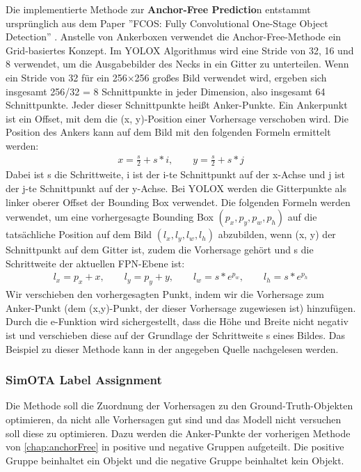 Die implementierte Methode zur \textbf{Anchor-Free Predictio}n entstammt ursprünglich aus dem Paper ''FCOS: Fully Convolutional One-Stage Object Detection'' \cite{yoloxAnchorFree}. Anstelle von Ankerboxen verwendet die Anchor-Free-Methode ein Grid-basiertes Konzept. Im YOLOX Algorithmus wird eine Stride von 32, 16 und 8 verwendet, um die Ausgabebilder des Necks in ein Gitter zu unterteilen. Wenn ein Stride von 32 für ein 256×256 großes Bild verwendet wird, ergeben sich insgesamt 256/32 = 8 Schnittpunkte in jeder Dimension, also insgesamt 64 Schnittpunkte. Jeder dieser Schnittpunkte heißt Anker-Punkte. Ein Ankerpunkt ist ein Offset, mit dem die (x, y)-Position einer Vorhersage verschoben wird. Die Position des Ankers kann auf dem Bild mit den folgenden Formeln ermittelt werden:
\begin{align}
	x = \frac{s}{2} + s*i, \qquad y = \frac{s}{2} + s*j
\end{align}
Dabei ist s die Schrittweite, i ist der i-te Schnittpunkt auf der x-Achse und j ist der j-te Schnittpunkt auf der y-Achse. Bei YOLOX werden die Gitterpunkte als linker oberer Offset der Bounding Box verwendet. Die folgenden Formeln werden verwendet, um eine vorhergesagte Bounding Box $(p_x, p_y, p_w, p_h)$ auf die tatsächliche Position auf dem Bild $(l_x, l_y, l_w, l_h)$ abzubilden, wenn (x, y) der Schnittpunkt auf dem Gitter ist, zudem die Vorhersage gehört und s die Schrittweite der aktuellen FPN-Ebene ist:
\begin{align}
	l_x=p_x+x, \qquad l_y=p_y+y, \qquad l_w=s*e^{p_w}, \qquad l_h=s*e^{p_h}
\end{align}
Wir verschieben den vorhergesagten Punkt, indem wir die Vorhersage zum Anker-Punkt (dem (x,y)-Punkt, der dieser Vorhersage zugewiesen ist) hinzufügen. Durch die e-Funktion wird sichergestellt, dass die Höhe und Breite nicht negativ ist und verschieben diese auf der Grundlage der Schrittweite s eines Bildes. Das Beispiel zu dieser Methode kann in der angegeben Quelle nachgelesen werden. \cite{yoloxExplanationHowWorks}


\subsubsection{SimOTA Label Assignment}
Die Methode soll die Zuordnung der Vorhersagen zu den Ground-Truth-Objekten optimieren, da nicht alle Vorhersagen gut sind und das Modell nicht versuchen soll diese zu optimieren. Dazu werden die Anker-Punkte der vorherigen Methode von \ref{chap:anchorFree} in positive und negative Gruppen aufgeteilt. Die positive Gruppe beinhaltet ein Objekt und die negative Gruppe beinhaltet kein Objekt.

